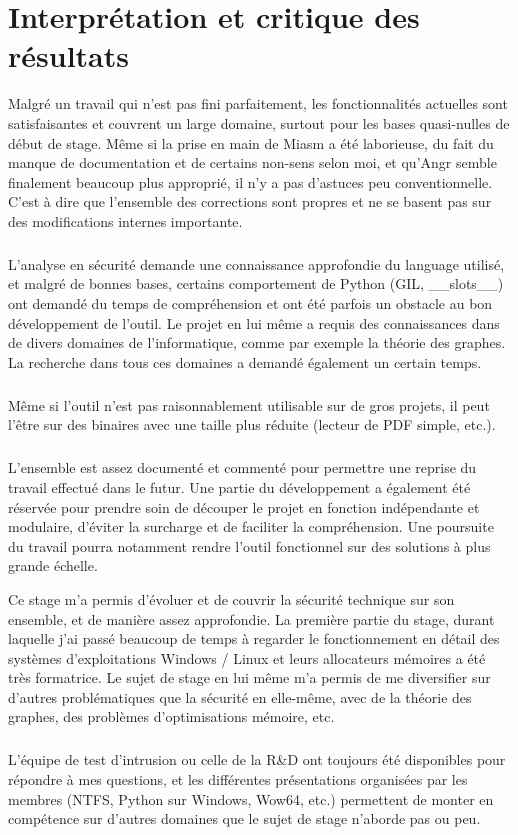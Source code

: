 \section{Interprétation et critique des résultats}
Malgré un travail qui n'est pas fini parfaitement, les fonctionnalités actuelles sont satisfaisantes et couvrent un large domaine, surtout pour les bases quasi-nulles de début de stage.
Même si la prise en main de Miasm a été laborieuse, du fait du manque de documentation et de certains non-sens selon moi, et qu'Angr semble finalement beaucoup plus approprié, il n'y a pas
d'astuces peu conventionnelle. C'est à dire que l'ensemble des corrections sont propres et ne se basent pas sur des modifications internes importante.
\subparagraph{}
L'analyse en sécurité demande une connaissance approfondie du language utilisé, et malgré de bonnes bases, certains comportement de Python (GIL, \_\_slots\_\_) ont demandé du temps de compréhension
et ont été parfois un obstacle au bon développement de l'outil. Le projet en lui même a requis des connaissances dans de divers domaines de l'informatique, comme par exemple la théorie des graphes.
La recherche dans tous ces domaines a demandé également un certain temps.
\subparagraph{}
Même si l'outil n'est pas raisonnablement utilisable sur de gros projets, il peut l'être sur des binaires avec une taille plus réduite (lecteur de PDF simple, etc.).
\subparagraph{}
L'ensemble est assez documenté et commenté pour permettre une reprise du travail effectué  dans le futur. Une partie du développement a également été réservée pour prendre
soin de découper le projet en fonction indépendante et modulaire, d'éviter la surcharge et de faciliter la compréhension. Une poursuite du travail pourra notamment rendre l'outil fonctionnel sur des
solutions à plus grande échelle.

Ce stage m'a permis d'évoluer et de couvrir la sécurité technique sur son ensemble, et de manière assez approfondie. La première partie du stage, durant laquelle j'ai passé beaucoup de temps à
regarder le fonctionnement en détail des systèmes d'exploitations Windows / Linux et leurs allocateurs mémoires a été très formatrice. Le sujet de stage en lui même m'a permis de me diversifier sur
d'autres problématiques que la sécurité en elle-même, avec de la théorie des graphes, des problèmes d'optimisations mémoire, etc.
\subparagraph{}
L'équipe de test d'intrusion ou celle de la R\&D ont toujours été disponibles pour répondre à mes questions, et les différentes présentations organisées par les membres (NTFS, Python sur Windows, Wow64, etc.)
permettent de monter en compétence sur d'autres domaines que le sujet de stage n'aborde pas ou peu.
